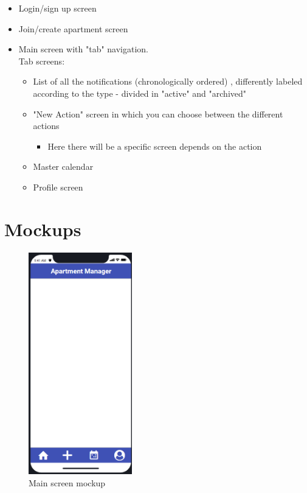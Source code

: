 \documentclass[]{article}
\begin{document}
	\begin{itemize}
		\item Login/sign up screen
		\item Join/create apartment screen
		\item Main screen with "tab" navigation. 
		\\Tab screens: 
		\begin{itemize}
			\item List of all the notifications (chronologically ordered) 
			, differently labeled according to the type 
			- divided in "active" and "archived"
			\item "New Action" screen in which you can choose between the different actions
			\begin{itemize}
				\item Here there will be a specific screen depends on the action 
			\end{itemize} 
			\item Master calendar
			\item Profile screen
		\end{itemize}
			
	\end{itemize}

	\section{Mockups}
	\begin{figure}[h!]
		\centering
		\includegraphics[width=4.5cm]{screen1.png}
		\caption{Main screen mockup}
		\label{fig:boat1}
	\end{figure}
\end{document}
